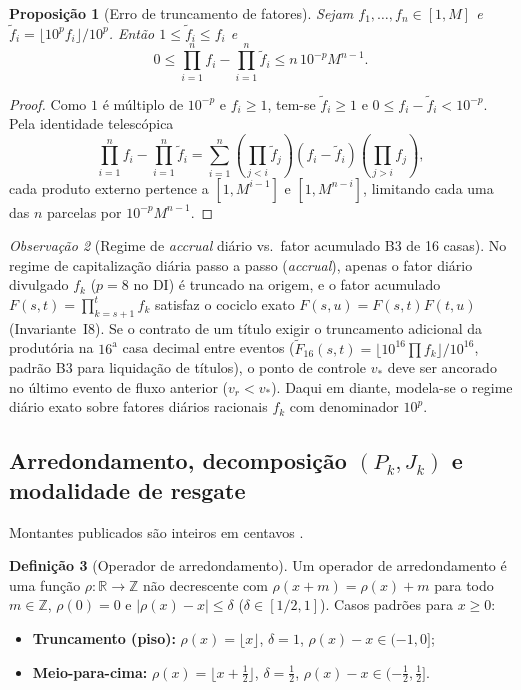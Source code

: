 \documentclass[11pt, a4paper]{article}
\theoremstyle{definition}
\newtheorem{definicao}{Definição}[section]
\theoremstyle{plain}
\newtheorem{proposicao}[definicao]{Proposição}
\theoremstyle{remark}
\newtheorem{observacao}[definicao]{Observação}
\begin{document}
\begin{proposicao}[Erro de truncamento de fatores]\label{prop:5.1}
Sejam $f_1, \dots, f_n \in [1, M]$ e $\tilde{f}_i = \lfloor 10^p f_i \rfloor / 10^p$. Então $1 \le \tilde{f}_i \le f_i$ e
\[
0 \le \prod_{i=1}^{n} f_i - \prod_{i=1}^{n} \tilde{f}_i \le n \, 10^{-p} M^{n-1}.
\]
\end{proposicao}
\begin{proof}
Como $1$ é múltiplo de $10^{-p}$ e $f_i \ge 1$, tem-se $\tilde{f}_i \ge 1$ e $0 \le f_i - \tilde{f}_i < 10^{-p}$. Pela identidade telescópica
\[
\prod_{i=1}^{n} f_i - \prod_{i=1}^{n} \tilde{f}_i = \sum_{i=1}^{n} \left(\prod_{j < i} \tilde{f}_j\right) (f_i - \tilde{f}_i) \left(\prod_{j > i} f_j\right),
\]
cada produto externo pertence a $[1, M^{i-1}]$ e $[1, M^{n-i}]$, limitando cada uma das $n$ parcelas por $10^{-p} M^{n-1}$.
\end{proof}

\begin{observacao}[Regime de \emph{accrual} diário vs.\ fator acumulado B3 de 16 casas]\label{obs:5.2}
No regime de capitalização diária passo a passo (\emph{accrual}), apenas o fator diário divulgado $f_k$ ($p=8$ no DI) é truncado na origem, e o fator acumulado $F(s,t) = \prod_{k=s+1}^t f_k$ satisfaz o cociclo exato $F(s,u) = F(s,t)F(t,u)$ (Invariante~I8). Se o contrato de um título exigir o truncamento adicional da produtória na $16^{\text{a}}$ casa decimal entre eventos ($\tilde{F}_{16}(s,t) = \lfloor 10^{16}\prod f_k\rfloor/10^{16}$, padrão B3 para liquidação de títulos), o ponto de controle $v_*$ deve ser ancorado no último evento de fluxo anterior ($v_r < v_*$). Daqui em diante, modela-se o regime diário exato sobre fatores diários racionais $f_k$ com denominador $10^p$.
\end{observacao}

\subsection{Arredondamento, decomposição $(P_k, J_k)$ e modalidade de resgate}\label{sec:5.2}

Montantes publicados são inteiros em centavos \cite{Higham2002}.

\begin{definicao}[Operador de arredondamento]\label{def:5.3}
Um operador de arredondamento é uma função $\rho : \mathbb{R} \to \mathbb{Z}$ não decrescente com $\rho(x + m) = \rho(x) + m$ para todo $m \in \mathbb{Z}$, $\rho(0) = 0$ e $|\rho(x) - x| \le \delta$ ($\delta \in [1/2, 1]$). Casos padrões para $x \ge 0$:
\begin{itemize}
    \item \textbf{Truncamento (piso):} $\rho(x) = \lfloor x \rfloor$, $\delta = 1$, $\rho(x) - x \in (-1, 0]$;
    \item \textbf{Meio-para-cima:} $\rho(x) = \lfloor x + \frac{1}{2} \rfloor$, $\delta = \frac{1}{2}$, $\rho(x) - x \in (-\frac{1}{2}, \frac{1}{2}]$.
\end{itemize}
\end{definicao}
\end{document}
